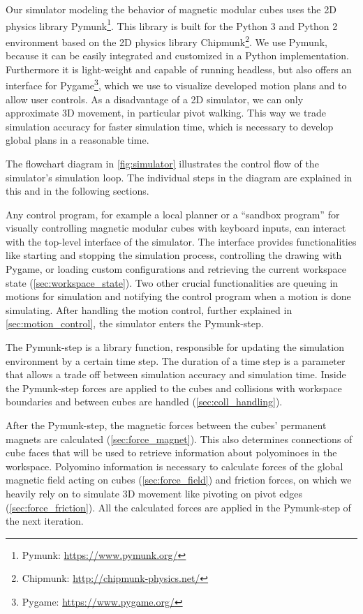 Our simulator modeling the behavior of magnetic modular cubes uses the 2D physics library Pymunk\footnote{Pymunk: \url{https://www.pymunk.org/}}.
This library is built for the Python 3 and Python 2 environment based on the 2D physics library Chipmunk\footnote{Chipmunk: \url{http://chipmunk-physics.net/}}.
We use Pymunk, because it can be easily integrated and customized in a Python implementation.
Furthermore it is light-weight and capable of running headless, but also offers an interface for Pygame\footnote{Pygame: \url{https://www.pygame.org/}}, which we use to visualize developed motion plans and to allow user controls.
As a disadvantage of a 2D simulator, we can only approximate 3D movement, in particular pivot walking.
This way we trade simulation accuracy for faster simulation time, which is necessary to develop global plans in a reasonable time.

The flowchart diagram in \autoref{fig:simulator} illustrates the control flow of the simulator's simulation loop.
The individual steps in the diagram are explained in this and in the following sections.

Any control program, for example a local planner or a ``sandbox program'' for visually controlling magnetic modular cubes with keyboard inputs, can interact with the top-level interface of the simulator.
The interface provides functionalities like starting and stopping the simulation process, controlling the drawing with Pygame, or loading custom configurations and retrieving the current workspace state (\autoref{sec:workspace_state}).
Two other crucial functionalities are queuing in motions for simulation and notifying the control program when a motion is done simulating.
After handling the motion control, further explained in \autoref{sec:motion_control}, the simulator enters the Pymunk-step.

The Pymunk-step is a library function, responsible for updating the simulation environment by a certain time step.
The duration of a time step is a parameter that allows a trade off between simulation accuracy and simulation time. 
Inside the Pymunk-step forces are applied to the cubes and collisions with workspace boundaries and between cubes are handled (\autoref{sec:coll_handling}).

After the Pymunk-step, the magnetic forces between the cubes' permanent magnets are calculated (\autoref{sec:force_magnet}).
This also determines connections of cube faces that will be used to retrieve information about polyominoes in the workspace.
Polyomino information is necessary to calculate forces of the global magnetic field acting on cubes (\autoref{sec:force_field}) and friction forces, on which we heavily rely on to simulate 3D movement like pivoting on pivot edges (\autoref{sec:force_friction}).
All the calculated forces are applied in the Pymunk-step of the next iteration.

